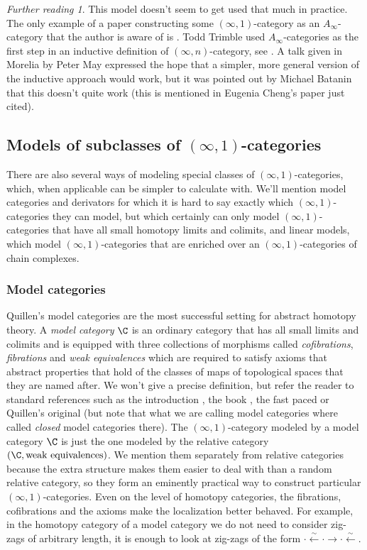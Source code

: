 \documentclass{conm-p-l}
\theoremstyle{definition} \newtheorem{definition}[theorem]{Definition}
\theoremstyle{remark} \newtheorem{remark}[theorem]{Remark}
\newtheorem*{further}{Further reading}
\numberwithin{equation}{section}
\newcommand{\oo}{\infty}
\newcommand{\io}{$(\oo,1)$}
\begin{document}
\begin{further}
  This model doesn't seem to get used that much in practice. The only
  example of a paper constructing some \io-category as an
  $A_\oo$-category that the author is aware of is \cite[Proposition
  1.4]{Ching}. Todd Trimble used $A_\oo$-categories as the first step
  in an inductive definition of $(\oo,n)$-category, see
  \cite{ChengOperadic}. A talk given in Morelia by Peter May
  \cite{MayMorelia} expressed the hope that a simpler, more general
  version of the inductive approach would work, but it was pointed out
  by Michael Batanin that this doesn't quite work (this is mentioned
  in Eugenia Cheng's paper just cited).
\end{further}

\subsection{Models of subclasses of \io-categories}

There are also several ways of modeling special classes of
\io-categories, which, when applicable can be simpler to calculate
with. We'll mention model categories and derivators for which it is
hard to say exactly which \io-categories they can model, but which
certainly can only model \io-categories that have all small homotopy
limits and colimits, and linear models, which model \io-categories
that are enriched over an \io-categories of chain complexes.

\subsubsection{Model categories}

Quillen's model categories are the most successful setting for
abstract homotopy theory. A \emph{model category} $\C$ is an ordinary
category that has all small limits and colimits and is equipped with
three collections of morphisms called \emph{cofibrations},
\emph{fibrations} and \emph{weak equivalences} which are required to
satisfy axioms that abstract properties that hold of the classes of
maps of topological spaces that they are named after. We won't give a
precise definition, but refer the reader to standard references such
as the introduction \cite{DwyerSpalinski}, the book \cite{Hovey}, the
fast paced \cite[Appendix A.2]{HTT} or Quillen's original
\cite{Quillen} (but note that what we are calling model categories
where called \emph{closed} model categories there). The \io-category
modeled by a model category $\C$ is just the one modeled by the
relative category $(\C, \text{weak equivalences})$. We mention them
separately from relative categories because the extra structure makes
them easier to deal with than a random relative category, so they form
an eminently practical way to construct particular \io-categories.
Even on the level of homotopy categories, the fibrations, cofibrations
and the axioms make the localization better behaved. For example, in
the homotopy category of a model category we do not need to consider
zig-zags of arbitrary length, it is enough to look at zig-zags of the
form $\cdot \xleftarrow{\sim} \cdot \to \cdot \xleftarrow{\sim}$.
\end{document}
